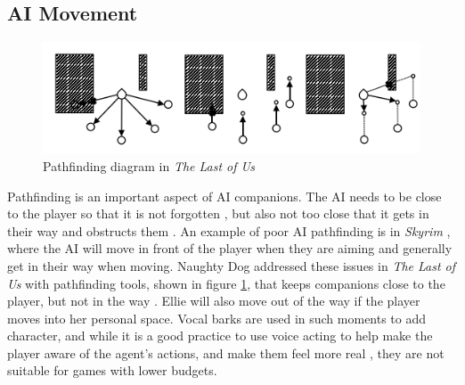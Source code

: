 \documentclass{IEEEtran}
\begin{document}

\subsection{AI Movement}
\label{Movement}

\begin{figure}
  \centering
  \includegraphics[width=\linewidth]{Images/IndustryResearch/TLOUPathfinding.png}
  
\caption{Pathfinding diagram in \textit{The Last of Us}}
\label{fig:TLOUPathfinding}
\end{figure}

Pathfinding is an important aspect of AI companions. The AI needs to be close to the player so that it is not forgotten \cite{GAIP2EllieAI}, but also not too close that it gets in their way and obstructs them \cite{CoupledEmpowermentMaximisation}. An example of poor AI pathfinding is in \textit{Skyrim} \cite{tremblay2013adaptive}, where the AI will move in front of the player when they are aiming and generally get in their way when moving. Naughty Dog addressed these issues in \textit{The Last of Us} with pathfinding tools, shown in figure \ref{fig:TLOUPathfinding}, that keeps companions close to the player, but not in the way \cite{GAIP2EllieAI}. Ellie will also move out of the way if the player moves into her personal space. Vocal barks are used in such moments to add character, and while it is a good practice to use voice acting to help make the player aware of the agent’s actions, and make them feel more real \cite{GMTGoodAI}, they are not suitable for games with lower budgets.
\end{document}
